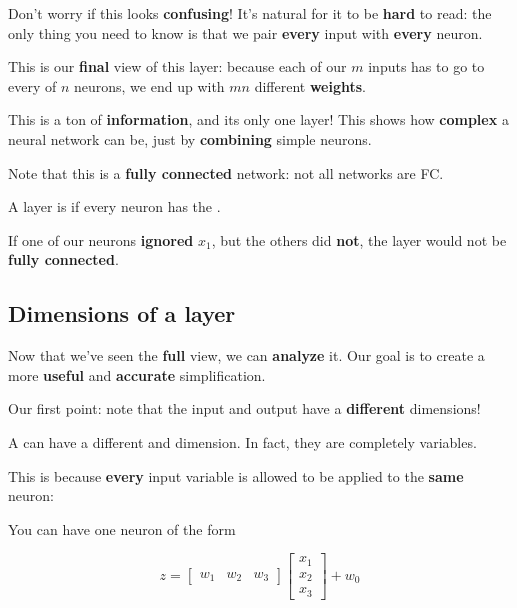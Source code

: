         Don't worry if this looks \textbf{confusing}! It's natural for it to be \textbf{hard} to read: the only thing you need to know is that we pair \textbf{every} input with \textbf{every} neuron.
        
        This is our \textbf{final} view of this layer: because each of our $m$ inputs has to go to every of $n$ neurons, we end up with $mn$ different \textbf{weights}.
        
        This is a ton of \textbf{information}, and its only one layer! This shows how \textbf{complex} a neural network can be, just by \textbf{combining} simple neurons.
        
        Note that this is a \textbf{fully connected} network: not all networks are FC.\\
        
        \begin{definition}
            A layer is  if every neuron has the .
        \end{definition}
        
        \miniex If one of our neurons \textbf{ignored} $x_1$, but the others did \textbf{not}, the layer would not be \textbf{fully connected}.
        
    \subsection*{Dimensions of a layer}
    
        Now that we've seen the \textbf{full} view, we can \textbf{analyze} it. Our goal is to create a more \textbf{useful} and \textbf{accurate} simplification.
        
        Our first point: note that the input and output have a \textbf{different} dimensions!\\
        
        \begin{clarification}
            A  can have a different  and  dimension. In fact, they are completely  variables.
        \end{clarification}
        
        This is because \textbf{every} input variable is allowed to be applied to the \textbf{same} neuron: 
            
        \miniex You can have one neuron of the form
        
        \begin{equation*}
            z = 
            \begin{bmatrix}
                w_1 & w_2 & w_3
            \end{bmatrix}
            \begin{bmatrix}
                x_1\\x_2\\x_3
            \end{bmatrix}
            +
            w_0
        \end{equation*}
        
